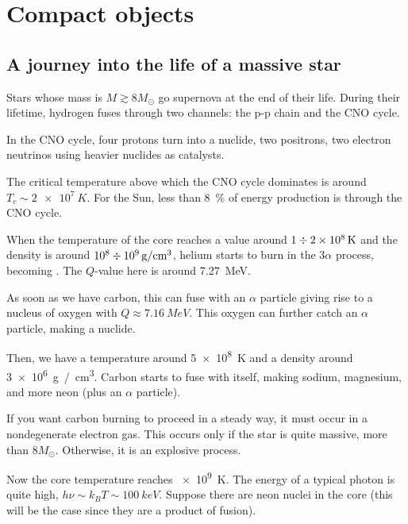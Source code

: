 \documentclass[main.tex]{subfiles}
\begin{document}
\chapter{Compact objects}

\section{A journey into the life of a massive star}


Stars whose mass is \(M \gtrsim 8 M_{\odot}\) go supernova at the end of their life. 
During their lifetime, hydrogen fuses through two channels: the p-p chain and the CNO cycle. 

In the CNO cycle, four protons turn into a  nuclide, two positrons, two electron neutrinos using heavier nuclides as catalysts. 

The critical temperature above which the CNO cycle dominates is around \(T_c \sim \SI{2e7}{K}\). For the Sun, less than \SI{8}{\percent} of energy production is through the CNO cycle. 

When the temperature of the core reaches a value around \(1 \divisionsymbol\SI{2e8}{K}\) and the density is around \(\num{e8} \divisionsymbol \SI{e9}{g / cm^3}\), helium starts to burn in the \(3 \alpha \) process, becoming . 
The \(Q\)-value here is around \SI{7.27}{MeV}.

As soon as we have carbon, this can fuse with an \(\alpha \) particle giving rise to a nucleus of oxygen with \(Q \approx \SI{7.16}{MeV}\). 
This oxygen can further catch an \(\alpha \) particle, making a  nuclide. 

Then, we have a temperature around \SI{5e8}{K} and a density around \SI{3e6}{g / cm^3}. Carbon starts to fuse with itself, making sodium, magnesium, and more neon (plus an \(\alpha \) particle). 

If you want carbon burning to proceed in a steady way, it must occur in a nondegenerate electron gas.
This occurs only if the star is quite massive, more than \(8 M_{\odot}\). Otherwise, it is an explosive process. 

Now the core temperature reaches \SI{e9}{K}. The energy of a typical photon is quite high, \(h \nu \sim k_B T \sim \SI{100}{keV}\). 
Suppose there are neon nuclei in the core (this will be the case since they are a product of fusion). 
\end{document}
